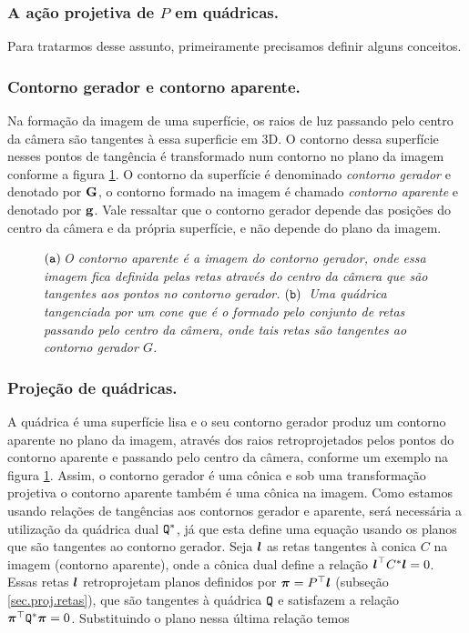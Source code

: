 \subsubsection{A ação projetiva de $P$ em quádricas.}\label{sec.proj-quadricas}
Para tratarmos desse assunto, primeiramente precisamos definir alguns conceitos.

\subsubsection*{Contorno gerador e contorno aparente.}
Na formação da imagem de uma superfície, os raios de luz passando pelo centro da câmera são tangentes à essa superficie em 3D. O contorno dessa superfície nesses pontos de tangência é transformado num contorno no plano da imagem conforme a figura \ref{fig.cont-gerador-aparente}. O contorno da superfície é denominado \textit{contorno gerador} e denotado por ${\bf G}$, o contorno formado na imagem é chamado \textit{contorno aparente} e denotado por ${\bf g}$. Vale ressaltar que o contorno gerador depende das posições do centro da câmera e da própria superfície, e não depende do plano da imagem.  

\begin{figure}[htb!]
\centering
{}
\caption{\textit{$({\tt a})\,$O contorno aparente é a imagem do contorno gerador, onde essa imagem fica definida pelas retas através do centro da câmera que são tangentes aos pontos no contorno gerador.$\,\,({\tt b})\,$ Uma quádrica tangenciada por um cone que é o formado pelo conjunto de retas passando pelo centro da câmera, onde tais retas são tangentes ao contorno gerador $G$. }}
\label{fig.cont-gerador-aparente}
\end{figure}

\subsubsection*{Projeção de quádricas.}
A quádrica é uma superfície lisa  e o seu contorno gerador produz um contorno aparente no plano da imagem, através dos raios retroprojetados pelos pontos do contorno aparente e passando pelo centro da câmera, conforme um exemplo na figura \ref{fig.cont-gerador-aparente}. Assim, o contorno gerador é uma cônica e sob uma transformação projetiva o contorno aparente também é uma cônica na imagem. Como estamos usando relações de tangências aos contornos gerador e aparente, será necessária a utilização da quádrica dual	${\tt Q}^*$, já que esta define uma equação usando os planos que são tangentes ao contorno gerador. Seja $\boldsymbol{l}$ as retas tangentes à conica $C$ na imagem (contorno aparente), onde a cônica dual define a relação $\boldsymbol{l}^\top C^*\boldsymbol{l}=0$. Essas retas $\boldsymbol{l}$ retroprojetam planos definidos por $\boldsymbol{\pi}=P^\top\boldsymbol{l}$ (subseção \ref{sec.proj.retas}), que são tangentes à quádrica ${\tt Q}$ e satisfazem a relação $\boldsymbol{\pi}^\top {\tt Q}^*\boldsymbol{\pi}=0$. Substituindo o plano nessa última relação temos

